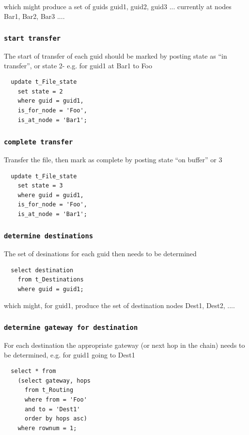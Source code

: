 \documentclass{cmspaper}
\begin{document}
which might produce a set of guids {guid1, guid2, guid3 ...} currently at nodes {Bar1, Bar2, Bar3 ...}. 

\subsubsection{\textbf{\texttt{start transfer}}}
The start of transfer of each guid should be marked by posting state as ``in transfer'', or state 2- e.g. for guid1 at Bar1 to Foo

{\small\begin{verbatim}
  update t_File_state
    set state = 2
    where guid = guid1,
    is_for_node = 'Foo',
    is_at_node = 'Bar1';
  \end{verbatim}}

\subsubsection{\textbf{\texttt{complete transfer}}}
Transfer the file, then mark as complete by posting state ``on buffer'' or 3

{\small\begin{verbatim}
  update t_File_state
    set state = 3
    where guid = guid1,
    is_for_node = 'Foo',
    is_at_node = 'Bar1';
\end{verbatim}}

\subsubsection{\textbf{\texttt{determine destinations}}}
The set of desinations for each guid then needs to be determined

{\small\begin{verbatim}
  select destination
    from t_Destinations
    where guid = guid1;
\end{verbatim}}

which might, for guid1, produce the set of destination nodes {Dest1, Dest2, ...}. 

\subsubsection{\textbf{\texttt{determine gateway for destination}}}
For each destination the appropriate gateway (or next hop in the chain) needs to be determined, e.g. for guid1 going to Dest1

{\small\begin{verbatim}
  select * from
    (select gateway, hops
      from t_Routing
      where from = 'Foo'
      and to = 'Dest1'
      order by hops asc)
    where rownum = 1;
\end{verbatim}}
\end{document}
